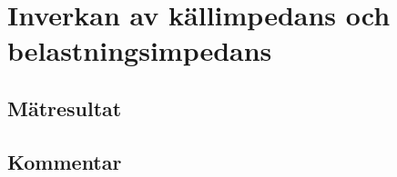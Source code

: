 %
%

\section{Inverkan av källimpedans och belastningsimpedans}\label{impedans}

\subsection{Mätresultat}\label{}

\subsection{Kommentar}\label{}


